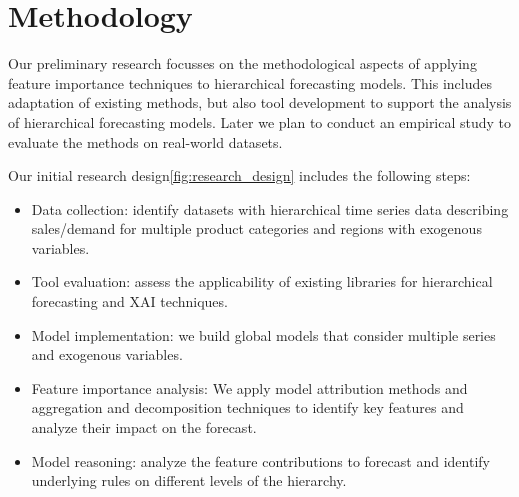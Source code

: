 \section{Methodology} \label{sec:methodology_preliminary_results}


Our preliminary research focusses on the methodological aspects of applying feature importance techniques to hierarchical forecasting models.
This includes adaptation of existing methods, but also tool development to support the analysis of hierarchical forecasting models.
Later we plan to conduct an empirical study to evaluate the methods on real-world datasets.

Our initial research design\ref{fig:research_design} includes the following steps:
\begin{itemize}
    \item Data collection: identify datasets with hierarchical time series data describing sales/demand for multiple product categories and regions with exogenous variables.
    \item Tool evaluation: assess the applicability of existing libraries for hierarchical forecasting and XAI techniques.
    \item Model implementation: we build global models that consider multiple series and exogenous variables.
    \item Feature importance analysis: We apply model attribution methods and aggregation and decomposition techniques to identify key features and analyze their impact on the forecast.
    \item Model reasoning: analyze the feature contributions to forecast and identify underlying rules on different levels of the hierarchy.
\end{itemize}




